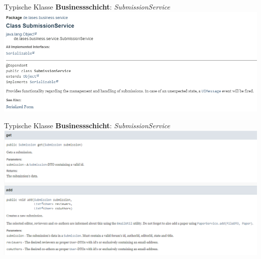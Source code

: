 \documentclass{beamer}
\begin{document}
    \begin{frame}{Typische Klasse \textbf{Businessschicht}: \emph{SubmissionService}}
        \centering
        \includegraphics[height=0.5\textheight]{graphics/service/doc_service}
    \end{frame}
    \begin{frame}{Typische Klasse \textbf{Businessschicht}: \emph{SubmissionService}}
        \centering
        \includegraphics[height=0.6\textheight]{graphics/service/doc_get_add}
    \end{frame}
\end{document}
